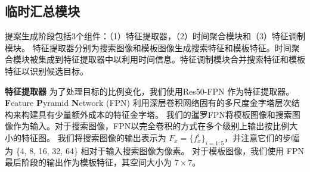 \subsection{临时汇总模块}
\label{sec:stage1}
提案生成阶段包括3个组件：（1）特征提取器，（2）时间聚合模块和（3）特征调制模块。
特征提取器分别为搜索图像和模板图像生成搜索特征和模板特征。时间聚合模块被集成到特征提取器中以利用时间信息。特征调制模块合并搜索特征和模板特征以识别候选目标。

\textbf{特征提取器} 为了处理目标的比例变化，我们使用Res50-FPN \cite{lin2017feature} 作为特征提取器。
\textbf{F}eature \textbf{P}yramid \textbf{N}etwork (FPN) 利用深层卷积网络固有的多尺度金字塔层次结构来构建具有少量额外成本的特征金字塔。
我们的暹罗FPN将模板图像和搜索图像作为输入。对于搜索图像，FPN以完全卷积的方式在多个级别上输出按比例大小的特征图。
我们将搜索图像的输出表示为 $F_{x} = \{f_{x}^i\}_{i=1:5}$，并注意它们的步幅为 \{4, 8, 16, 32, 64\} 相对于输入搜索图像为像素。
对于模板图像，我们使用 FPN 最后阶段的输出作为模板特征，其空间大小为 $7 \times 7$。

